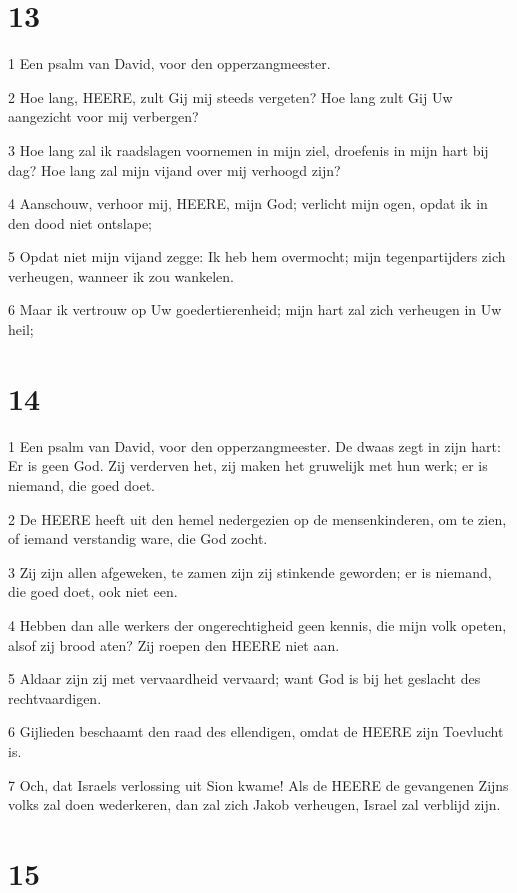 \chapter{13}

\par 1 Een psalm van David, voor den opperzangmeester.
\par 2 Hoe lang, HEERE, zult Gij mij steeds vergeten? Hoe lang zult Gij Uw aangezicht voor mij verbergen?
\par 3 Hoe lang zal ik raadslagen voornemen in mijn ziel, droefenis in mijn hart bij dag? Hoe lang zal mijn vijand over mij verhoogd zijn?
\par 4 Aanschouw, verhoor mij, HEERE, mijn God; verlicht mijn ogen, opdat ik in den dood niet ontslape;
\par 5 Opdat niet mijn vijand zegge: Ik heb hem overmocht; mijn tegenpartijders zich verheugen, wanneer ik zou wankelen.
\par 6 Maar ik vertrouw op Uw goedertierenheid; mijn hart zal zich verheugen in Uw heil;

\chapter{14}

\par 1 Een psalm van David, voor den opperzangmeester. De dwaas zegt in zijn hart: Er is geen God. Zij verderven het, zij maken het gruwelijk met hun werk; er is niemand, die goed doet.
\par 2 De HEERE heeft uit den hemel nedergezien op de mensenkinderen, om te zien, of iemand verstandig ware, die God zocht.
\par 3 Zij zijn allen afgeweken, te zamen zijn zij stinkende geworden; er is niemand, die goed doet, ook niet een.
\par 4 Hebben dan alle werkers der ongerechtigheid geen kennis, die mijn volk opeten, alsof zij brood aten? Zij roepen den HEERE niet aan.
\par 5 Aldaar zijn zij met vervaardheid vervaard; want God is bij het geslacht des rechtvaardigen.
\par 6 Gijlieden beschaamt den raad des ellendigen, omdat de HEERE zijn Toevlucht is.
\par 7 Och, dat Israels verlossing uit Sion kwame! Als de HEERE de gevangenen Zijns volks zal doen wederkeren, dan zal zich Jakob verheugen, Israel zal verblijd zijn.

\chapter{15}

